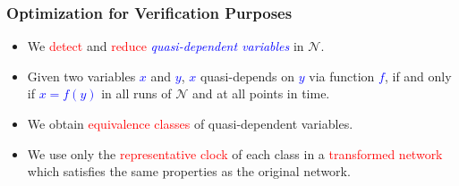 \documentclass[serif]{beamer}
\begin{document}
\begin{frame}\frametitle{\textbf{Optimization for Verification Purposes}}
\begin{itemize}
	\item We \textcolor{red}{detect} and \textcolor{red}{reduce} 
				\emph{\textcolor{blue}{quasi-dependent variables}} in $\mathcal{N}$.
	\item Given two variables \textcolor{blue}{$x$} and \textcolor{blue}{$y$}, \textcolor{blue}{$x$} quasi-depends
on \textcolor{blue}{$y$} via function \textcolor{blue}{$f$}, if and only if \textcolor{blue}{$x=f(y)$} in all 
runs of $\mathcal{N}$ and at all points in time.
	\item We obtain \textcolor{red}{equivalence classes} of quasi-dependent variables. 
	\item We use only the \textcolor{red}{representative clock} of each class in a 
				\textcolor{red}{transformed network} which satisfies the same properties as
				the original network.
\end{itemize}
\end{frame} 
\end{document}

